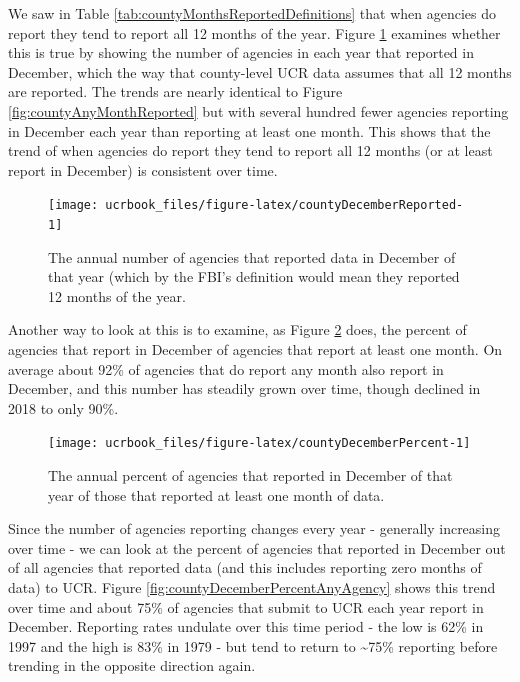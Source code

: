 \documentclass[
  12pt,
  openany]{book}
\begin{document}
We saw in Table \ref{tab:countyMonthsReportedDefinitions} that when agencies do report they tend to report all 12 months of the year. Figure \ref{fig:countyDecemberReported} examines whether this is true by showing the number of agencies in each year that reported in December, which the way that county-level UCR data assumes that all 12 months are reported. The trends are nearly identical to Figure \ref{fig:countyAnyMonthReported} but with several hundred fewer agencies reporting in December each year than reporting at least one month. This shows that the trend of when agencies do report they tend to report all 12 months (or at least report in December) is consistent over time.

\begin{figure}

{\centering \texttt{[image: ucrbook\_files/figure-latex/countyDecemberReported-1]} 

}

\caption{The annual number of agencies that reported data in December of that year (which by the FBI's definition would mean they reported 12 months of the year.}\label{fig:countyDecemberReported}
\end{figure}

Another way to look at this is to examine, as Figure \ref{fig:countyDecemberPercent} does, the percent of agencies that report in December of agencies that report at least one month. On average about 92\% of agencies that do report any month also report in December, and this number has steadily grown over time, though declined in 2018 to only 90\%.

\begin{figure}

{\centering \texttt{[image: ucrbook\_files/figure-latex/countyDecemberPercent-1]} 

}

\caption{The annual percent of agencies that reported in December of that year of those that reported at least one month of data.}\label{fig:countyDecemberPercent}
\end{figure}

Since the number of agencies reporting changes every year - generally increasing over time - we can look at the percent of agencies that reported in December out of all agencies that reported data (and this includes reporting zero months of data) to UCR. Figure \ref{fig:countyDecemberPercentAnyAgency} shows this trend over time and about 75\% of agencies that submit to UCR each year report in December. Reporting rates undulate over this time period - the low is 62\% in 1997 and the high is 83\% in 1979 - but tend to return to \textasciitilde75\% reporting before trending in the opposite direction again.
\end{document}
